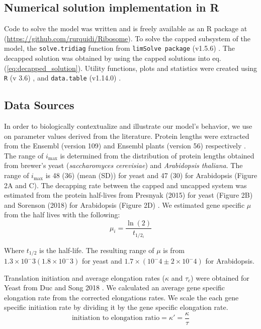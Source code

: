 \documentclass[a4,center,fleqn,nocrop]{NAR}
\newcommand{\imax}{\ensuremath{{i_{\max}}}\xspace}
\begin{document}
\subsection{Numerical solution implementation in R}
Code to solve the model was written and is freely available as an R package at (\url{https://github.com/rurquidi/Ribosome}). To solve the capped subsystem of the model, the \texttt{solve.tridiag} function from \texttt{limSolve package} (v1.5.6) \citep{RN41}. The decapped solution was obtained by using the capped solutions into eq. (\ref{eq:decapped_solution}). Utility functions, plots and statistics were created using  \texttt{R} (v 3.6) \citep{RN43}, and  \texttt{data.table} (v1.14.0) \citep{RN42}. 
		
\subsection{Data Sources}

In order to biologically contextualize and illustrate our model's behavior, we use on parameter values derived from the literature.
Protein lengths were extracted from the Ensembl (version 109) and Ensembl plants (version 56) respectively \citep{RN26,RN25,RN24}.  
The range of \imax is determined from the distribution of protein lengths obtained from brewer's yeast (\textit{saccharomyces cerevisiae}) and \textit{Arabidopsis thaliana}. The range of \imax is  48 (36) (mean (SD)) for yeast and 47 (30) for Arabidopsis (Figure 2A and C).
The decapping rate between the capped and uncapped system was estimated from the protein half-lives from Presnyak (2015) for yeast (Figure 2B) and Sorenson (2018) for Arabidopsis (Figure 2D) \citep{RN27,RN28}.
We estimated gene specific $\mu$ from the half lives with the following:
	\begin{equation*}
		\mu_i = \frac{\ln(2)}{t_{1/2_i}}
	\end{equation*}

Where $t_{1/2}$ is the half-life. The resulting range of $\mu$ is from $1.3 \times 10^-3 (1.8 \times 10^-3)$ for yeast and $1.7 \times (10^-4 \pm 2 \times 10^-4)$ for Arabidopsis. 

Translation initiation and average elongation rates ($\kappa$ and $\tau_c$) were obtained for Yeast from Duc and Song 2018 \citep{RN13}. 
We calculated an average gene specific elongation rate from the corrected elongations rates. We scale the each gene specific initiation rate by dividing it by the gene specific elongation rate.
\begin{equation}
	\text{initiation to elongation ratio} = \kappa' = \frac{\kappa}{\tau}
\end{equation}
\end{document}
